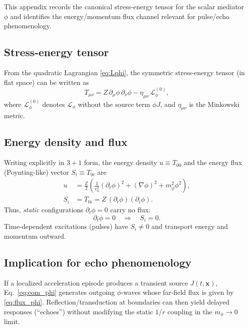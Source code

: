\documentclass[pdflatex,sn-mathphys-num]{revtex4-2}
\begin{document}
    This appendix records the canonical stress-energy tensor for the scalar mediator \(\phi\) and identifies the
    energy/momentum flux channel relevant for pulse/echo phenomenology.

    \subsection{Stress-energy tensor}
        From the quadratic Lagrangian \eqref{eq:Lphi}, the symmetric stress-energy tensor (in flat space) can be written as
        \begin{equation}
            T_{\mu\nu}
            =
            Z\,\partial_\mu \phi\,\partial_\nu \phi
            -
            \eta_{\mu\nu}\,\mathcal{L}_\phi^{(0)},
            \label{eq:Tmunu}
        \end{equation}
        where \(\mathcal{L}_\phi^{(0)}\) denotes \(\mathcal{L}_\phi\) without the source term \(\phi J\), and \(\eta_{\mu\nu}\)
        is the Minkowski metric.

    \subsection{Energy density and flux}
        Writing explicitly in \(3+1\) form, the energy density \(u\equiv T_{00}\) and the energy flux (Poynting-like) vector
        \(S_i\equiv T_{0i}\) are
        \begin{align}
            u
            &=
            \frac{Z}{2}\left(
            \frac{1}{c_\phi^2}(\partial_t\phi)^2
            +
            (\nabla\phi)^2
            +
            m_\phi^2\phi^2
            \right),
            \label{eq:u_phi}
            \\
            S_i
            &=
            T_{0i}
            =
            Z\,(\partial_t\phi)(\partial_i\phi).
            \label{eq:flux_phi}
        \end{align}
        Thus, \emph{static} configurations \(\partial_t\phi=0\) carry no flux:
        \begin{equation}
            \partial_t\phi=0 \quad\Rightarrow\quad S_i=0.
        \end{equation}
        Time-dependent excitations (pulses) have \(S_i\neq 0\) and transport energy and momentum outward.

    \subsection{Implication for echo phenomenology}
        If a localized acceleration episode produces a transient source \(J(t,\mathbf{x})\), Eq.~\eqref{eq:eom_phi} generates
        outgoing \(\phi\)-waves whose far-field flux is given by \eqref{eq:flux_phi}. Reflection/transduction at boundaries
        can then yield delayed responses (``echoes'') without modifying the static \(1/r\) coupling in the \(m_\phi\to 0\) limit.
\end{document}
